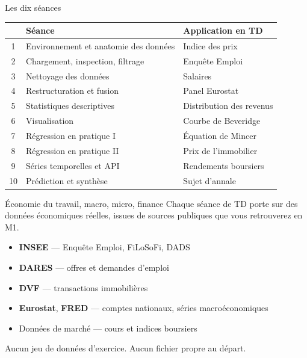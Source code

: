 \documentclass[10pt,aspectratio=169]{beamer}
\begin{document}
\begin{frame}{Les dix séances}
\small
\begin{tabular}{clp{6.2cm}}
\toprule
& \textbf{Séance} & \textbf{Application en TD} \\
\midrule
1 & Environnement et anatomie des données & Indice des prix \\
2 & Chargement, inspection, filtrage & Enquête Emploi \\
3 & Nettoyage des données & Salaires \\
4 & Restructuration et fusion & Panel Eurostat \\
5 & Statistiques descriptives & Distribution des revenus \\
\midrule
6 & Visualisation & Courbe de Beveridge \\
7 & Régression en pratique I & Équation de Mincer \\
8 & Régression en pratique II & Prix de l'immobilier \\
\midrule
9 & Séries temporelles et API & Rendements boursiers \\
10 & Prédiction et synthèse & Sujet d'annale \\
\bottomrule
\end{tabular}
\end{frame}

\begin{frame}{Économie du travail, macro, micro, finance}
Chaque séance de TD porte sur des données économiques réelles, issues de sources publiques que vous retrouverez en M1.

\vspace{1.2em}
\begin{itemize}
  \item \textbf{INSEE} --- Enquête Emploi, FiLoSoFi, DADS
  \item \textbf{DARES} --- offres et demandes d'emploi
  \item \textbf{DVF} --- transactions immobilières
  \item \textbf{Eurostat}, \textbf{FRED} --- comptes nationaux, séries macroéconomiques
  \item Données de marché --- cours et indices boursiers
\end{itemize}

\vspace{1.2em}
Aucun jeu de données d'exercice. Aucun fichier propre au départ.
\end{frame}

\end{document}
